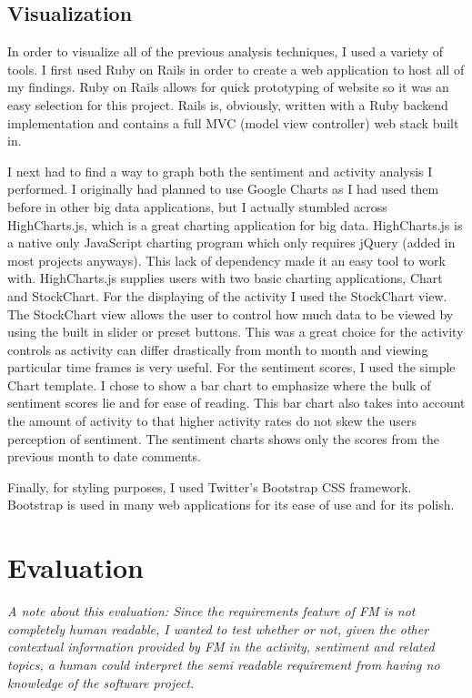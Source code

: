 \documentclass[conference]{IEEEtran}
\begin{document}
\subsection{Visualization}

In order to visualize all of the previous analysis techniques, I used a variety of tools. I first used Ruby
on Rails in order to create a web application to host all of my findings. Ruby on Rails allows for quick prototyping
of website so it was an easy selection for this project. Rails is, obviously, written with a Ruby backend implementation
and contains a full MVC (model view controller) web stack built in.

I next had to find a way to graph both the sentiment and activity analysis I performed. I originally had planned
to use Google Charts as I had used them before in other big data applications, but I actually stumbled across
HighCharts.js, which is a great charting application for big data. HighCharts.js is a native only JavaScript
charting program which only requires jQuery (added in most projects anyways). This lack of dependency made it
an easy tool to work with. HighCharts.js supplies users with two basic charting applications, Chart and StockChart.
For the displaying of the activity I used the StockChart view. The StockChart view allows the user to control
how much data to be viewed by using the built in slider or preset buttons. This was a great choice for the activity
controls as activity can differ drastically from month to month and viewing particular time frames is very useful.
For the sentiment scores, I used the simple Chart template. I chose to show a bar chart to emphasize where the
bulk of sentiment scores lie and for ease of reading. This bar chart also takes into account the amount of activity
to that higher activity rates do not skew the users perception of sentiment. The sentiment charts shows only
the scores from the previous month to date comments.

Finally, for styling purposes, I used Twitter's Bootstrap CSS framework. Bootstrap is used in many web applications
for its ease of use and for its polish.

\section{Evaluation}
\label{sec:eval}

\textit{A note about this evaluation: Since the requirements feature of FM is not completely human readable,
I wanted to test whether or not, given the other contextual information provided by FM in the activity,
sentiment and related topics, a human could interpret the semi readable requirement from having no knowledge
of the software project.}
\end{document}
